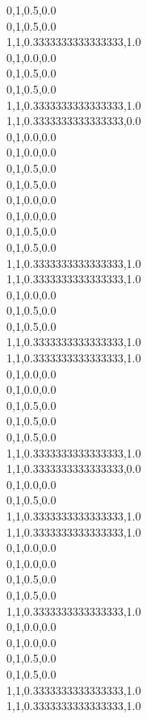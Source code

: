 0,1,0.5,0.0\\
0,1,0.5,0.0\\
1,1,0.3333333333333333,1.0\\
0,1,0.0,0.0\\
0,1,0.5,0.0\\
0,1,0.5,0.0\\
1,1,0.3333333333333333,1.0\\
1,1,0.3333333333333333,0.0\\
0,1,0.0,0.0\\
0,1,0.0,0.0\\
0,1,0.5,0.0\\
0,1,0.5,0.0\\
0,1,0.0,0.0\\
0,1,0.0,0.0\\
0,1,0.5,0.0\\
0,1,0.5,0.0\\
1,1,0.3333333333333333,1.0\\
1,1,0.3333333333333333,1.0\\
0,1,0.0,0.0\\
0,1,0.5,0.0\\
0,1,0.5,0.0\\
1,1,0.3333333333333333,1.0\\
1,1,0.3333333333333333,1.0\\
0,1,0.0,0.0\\
0,1,0.0,0.0\\
0,1,0.5,0.0\\
0,1,0.5,0.0\\
0,1,0.5,0.0\\
1,1,0.3333333333333333,1.0\\
1,1,0.3333333333333333,0.0\\
0,1,0.0,0.0\\
0,1,0.5,0.0\\
1,1,0.3333333333333333,1.0\\
1,1,0.3333333333333333,1.0\\
0,1,0.0,0.0\\
0,1,0.0,0.0\\
0,1,0.5,0.0\\
0,1,0.5,0.0\\
1,1,0.3333333333333333,1.0\\
0,1,0.0,0.0\\
0,1,0.0,0.0\\
0,1,0.5,0.0\\
0,1,0.5,0.0\\
1,1,0.3333333333333333,1.0\\
1,1,0.3333333333333333,1.0\\
